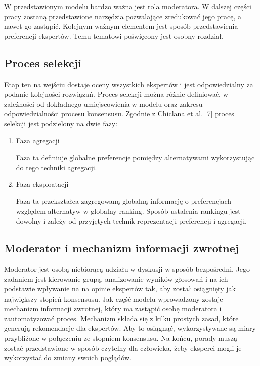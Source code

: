 W przedstawionym modelu bardzo ważna jest rola moderatora. W dalszej części 
pracy zostaną przedstawione narzędzia pozwalające zredukować jego pracę, a 
nawet go zastąpić. Kolejnym ważnym elementem jest sposób przedstawienia 
preferencji ekspertów. Temu tematowi poświęcony jest osobny rozdział.

\subsection{Proces selekcji}
Etap ten na wejściu dostaje oceny wszystkich ekspertów i jest odpowiedzialny za 
podanie kolejności rozwiązań. Proces selekcji można różnie definiować, w 
zależności od dokładnego umiejscowienia w modelu oraz zakresu odpowiedzialności 
procesu konsensusu. Zgodnie z Chiclana et al. [7] proces selekcji jest
podzielony na dwie fazy:
\begin{enumerate}
  \item Faza agregacji
  
  Faza ta definiuje globalne preferencje pomiędzy alternatywami wykorzystując 
  do tego techniki agregacji.
  
  \item Faza eksploatacji
  
  Faza ta przekształca zagregowaną globalną informację o preferencjach względem 
  alternatyw w globalny ranking. Sposób ustalenia rankingu jest dowolny i zależy
  od przyjętych technik reprezentacji preferencji i agregacji.

\end{enumerate}

\subsection{Moderator i mechanizm informacji zwrotnej}
Moderator jest osobą niebiorącą udziału w dyskusji w sposób bezpośredni. Jego
zadaniem jest kierowanie grupą, analizowanie wyników głosowań i na ich podstawie
wpływanie na na opinie ekspertów tak, aby został osiągnięty jak największy 
stopień konsensusu. Jak część modelu wprowadzony zostaje mechanizm informacji 
zwrotnej, który ma zastąpić osobę moderatora i zautomatyzować proces. Mechanizm 
składa się z kilku prostych zasad, które generują rekomendacje dla ekspertów. 
Aby to osiągnąć, wykorzystywane są miary przybliżone w połączeniu ze stopniem 
konsensusu. Na końcu, porady muszą zostać przedstawione w sposób czytelny dla 
człowieka, żeby eksperci mogli je wykorzystać do zmiany swoich poglądów.

